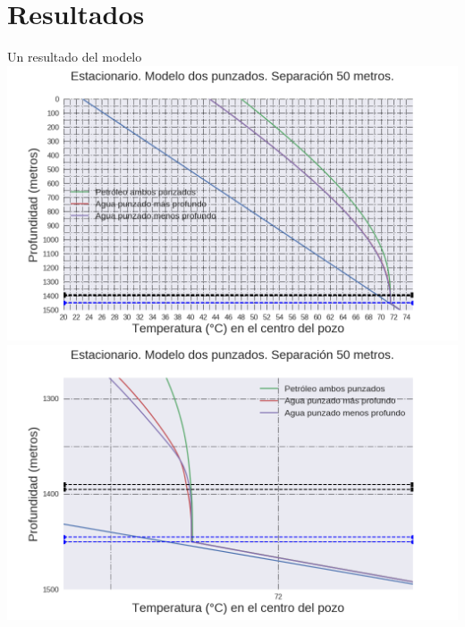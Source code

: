 \documentclass[presentation]{beamer}
\begin{document}
\section{Resultados}
\begin{frame}{Un resultado del modelo}
	\includegraphics[height=.45\textheight]{./perfil2.png}
	\includegraphics[height=.45\textheight]{./perfil1.png}
\end{frame}
\end{document}
